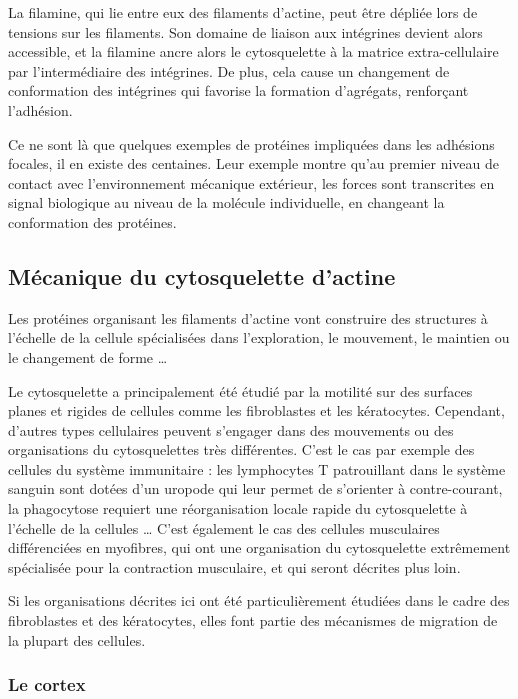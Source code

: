 La filamine, qui lie entre eux des filaments d'actine, peut être dépliée lors de tensions sur les filaments. Son domaine de liaison aux intégrines devient alors accessible, et la filamine ancre alors le cytosquelette à la matrice extra-cellulaire par l'intermédiaire des intégrines. De plus, cela cause un changement de conformation des intégrines qui favorise la formation d'agrégats, renforçant l'adhésion. 

Ce ne sont là que quelques exemples de protéines impliquées dans les adhésions focales, il en existe des centaines. Leur exemple montre qu'au premier niveau de contact avec l'environnement mécanique extérieur, les forces sont transcrites en signal biologique au niveau de la molécule individuelle, en changeant la conformation des protéines. 

\subsection{Mécanique du cytosquelette d'actine}

Les protéines organisant les filaments d'actine vont construire des structures à l'échelle de la cellule spécialisées dans l'exploration, le mouvement, le maintien ou le changement de forme \dots

Le cytosquelette  a principalement été étudié par la motilité sur des surfaces planes et rigides de cellules comme les fibroblastes et les kératocytes. 
Cependant, d'autres types cellulaires peuvent s'engager dans des mouvements ou des organisations du cytosquelettes très différentes. 
C'est le cas par exemple des cellules du système immunitaire : les lymphocytes T patrouillant dans le système sanguin sont dotées d'un uropode qui leur permet de s'orienter à contre-courant, la phagocytose requiert une réorganisation locale rapide du cytosquelette à l'échelle de la cellules \dots
C'est également le cas des cellules musculaires différenciées en myofibres, qui ont une organisation du cytosquelette extrêmement spécialisée pour la contraction musculaire, et qui seront décrites plus loin. 

Si les organisations décrites ici ont été particulièrement étudiées dans le cadre des fibroblastes et des kératocytes, elles font partie des mécanismes de migration de la plupart des cellules. 

\subsubsection{Le cortex}


